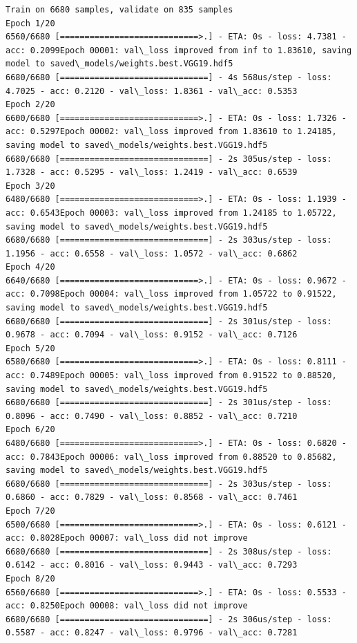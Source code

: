 \documentclass[11pt]{article}
\begin{document}
    \begin{Verbatim}[commandchars=\\\{\}]
Train on 6680 samples, validate on 835 samples
Epoch 1/20
6560/6680 [============================>.] - ETA: 0s - loss: 4.7381 - acc: 0.2099Epoch 00001: val\_loss improved from inf to 1.83610, saving model to saved\_models/weights.best.VGG19.hdf5
6680/6680 [==============================] - 4s 568us/step - loss: 4.7025 - acc: 0.2120 - val\_loss: 1.8361 - val\_acc: 0.5353
Epoch 2/20
6600/6680 [============================>.] - ETA: 0s - loss: 1.7326 - acc: 0.5297Epoch 00002: val\_loss improved from 1.83610 to 1.24185, saving model to saved\_models/weights.best.VGG19.hdf5
6680/6680 [==============================] - 2s 305us/step - loss: 1.7328 - acc: 0.5295 - val\_loss: 1.2419 - val\_acc: 0.6539
Epoch 3/20
6480/6680 [============================>.] - ETA: 0s - loss: 1.1939 - acc: 0.6543Epoch 00003: val\_loss improved from 1.24185 to 1.05722, saving model to saved\_models/weights.best.VGG19.hdf5
6680/6680 [==============================] - 2s 303us/step - loss: 1.1956 - acc: 0.6558 - val\_loss: 1.0572 - val\_acc: 0.6862
Epoch 4/20
6640/6680 [============================>.] - ETA: 0s - loss: 0.9672 - acc: 0.7098Epoch 00004: val\_loss improved from 1.05722 to 0.91522, saving model to saved\_models/weights.best.VGG19.hdf5
6680/6680 [==============================] - 2s 301us/step - loss: 0.9678 - acc: 0.7094 - val\_loss: 0.9152 - val\_acc: 0.7126
Epoch 5/20
6580/6680 [============================>.] - ETA: 0s - loss: 0.8111 - acc: 0.7489Epoch 00005: val\_loss improved from 0.91522 to 0.88520, saving model to saved\_models/weights.best.VGG19.hdf5
6680/6680 [==============================] - 2s 301us/step - loss: 0.8096 - acc: 0.7490 - val\_loss: 0.8852 - val\_acc: 0.7210
Epoch 6/20
6480/6680 [============================>.] - ETA: 0s - loss: 0.6820 - acc: 0.7843Epoch 00006: val\_loss improved from 0.88520 to 0.85682, saving model to saved\_models/weights.best.VGG19.hdf5
6680/6680 [==============================] - 2s 303us/step - loss: 0.6860 - acc: 0.7829 - val\_loss: 0.8568 - val\_acc: 0.7461
Epoch 7/20
6500/6680 [============================>.] - ETA: 0s - loss: 0.6121 - acc: 0.8028Epoch 00007: val\_loss did not improve
6680/6680 [==============================] - 2s 308us/step - loss: 0.6142 - acc: 0.8016 - val\_loss: 0.9443 - val\_acc: 0.7293
Epoch 8/20
6560/6680 [============================>.] - ETA: 0s - loss: 0.5533 - acc: 0.8250Epoch 00008: val\_loss did not improve
6680/6680 [==============================] - 2s 306us/step - loss: 0.5587 - acc: 0.8247 - val\_loss: 0.9796 - val\_acc: 0.7281

\end{Verbatim}
\end{document}
